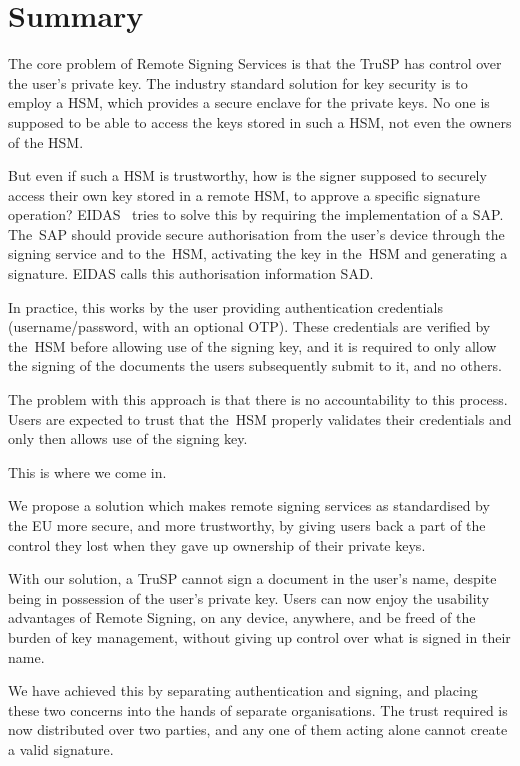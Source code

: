 \chapter*{Summary}
The core problem of Remote Signing Services is that the \gls{TruSP} has control over the user's private key.
The industry standard solution for key security is to employ a \gls{HSM},
which provides a secure enclave for the private keys.
No one is supposed to be able to access the keys stored in such a \gls{HSM},
not even the owners of the \gls{HSM}.

But even if such a \gls{HSM} is trustworthy,
how is the signer supposed to securely access their own key stored in a remote \gls{HSM},
to approve a specific signature operation? EIDAS~\cite{eidas} tries to solve this by requiring the implementation of a \gls{SAP}.
The~\gls{SAP} should provide secure authorisation from the user's device through the signing service and to the~\gls{HSM},
activating the key in the~\gls{HSM} and generating a signature.
EIDAS calls this authorisation information \gls{SAD}.

In practice,
this works by the user providing authentication credentials (username/password, with an optional \gls{OTP}).
These credentials are verified by the~\gls{HSM} before allowing use of the signing key,
and it is required to only allow the signing of the documents the users subsequently submit to it, and no others.

The problem with this approach is that there is no accountability to this process.
Users are expected to trust that the~\gls{HSM} properly validates their credentials and only then
allows use of the signing key.

This is where we come in.

We propose a solution which makes remote signing services as standardised by the \gls{EU} more secure,
and more trustworthy,
by giving users back a part of the control they lost when they gave up ownership of their private keys.


With our solution,
a \gls{TruSP} cannot sign a document in the user's name,
despite being in possession of the user's private key.
Users can now enjoy the usability advantages of Remote Signing,
on any device, anywhere,
and be freed of the burden of key management,
without giving up control over what is signed in their name.

We have achieved this by separating authentication and signing,
and placing these two concerns into the hands of separate organisations.
The trust required is now distributed over two parties,
and any one of them acting alone cannot create a valid signature.


